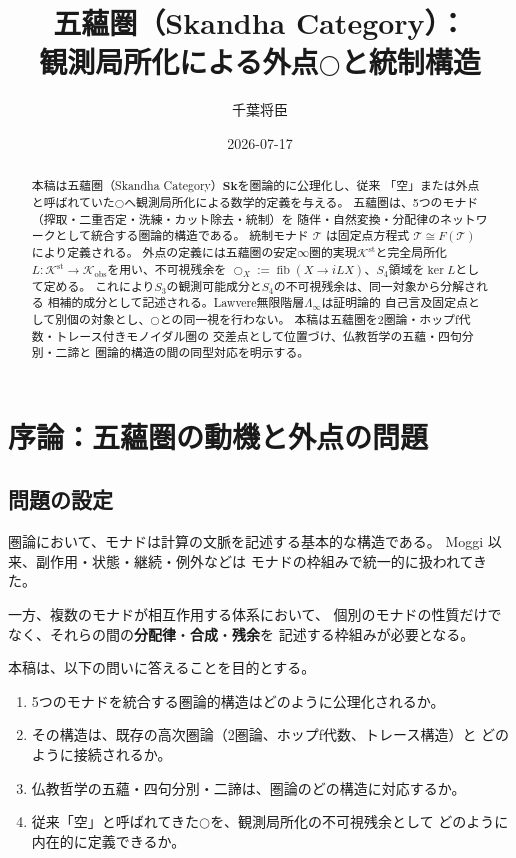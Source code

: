 \documentclass[11pt,a4paper]{ltjsarticle}
\theoremstyle{definition}
\newcommand{\Sk}{\mathbf{Sk}}
\newcommand{\T}{\mathcal{T}}
\newcommand{\LawvereInfinity}{\Lambda_\infty}
\newcommand{\Kstab}{\mathcal{K}^{\mathrm{st}}}
\newcommand{\Kobs}{\mathcal{K}_{\mathrm{obs}}}
\begin{document}
\title{五蘊圏（Skandha Category）：\\
観測局所化による外点$\bigcirc$と統制構造}
\author{千葉将臣}
\date{2026-07-17}
\maketitle

\begin{abstract}
本稿は五蘊圏（Skandha Category）$\Sk$を圏論的に公理化し、従来
「空」または外点と呼ばれていた$\bigcirc$へ観測局所化による数学的定義を与える。
五蘊圏は、5つのモナド（搾取・二重否定・洗練・カット除去・統制）を
随伴・自然変換・分配律のネットワークとして統合する圏論的構造である。
統制モナド $\T$ は固定点方程式 $\T \cong F(\T)$ により定義される。
外点の定義には五蘊圏の安定$\infty$圏的実現$\Kstab$と完全局所化
$L:\Kstab\to\Kobs$を用い、不可視残余を
$\bigcirc_X:=\operatorname{fib}(X\to iLX)$、$S_4$領域を$\ker L$として定める。
これにより$S_3$の観測可能成分と$S_4$の不可視残余は、同一対象から分解される
相補的成分として記述される。Lawvere無限階層$\LawvereInfinity$は証明論的
自己言及固定点として別個の対象とし、$\bigcirc$との同一視を行わない。
本稿は五蘊圏を2圏論・ホップf代数・トレース付きモノイダル圏の
交差点として位置づけ、仏教哲学の五蘊・四句分別・二諦と
圏論的構造の間の同型対応を明示する。
\end{abstract}

\tableofcontents
\newpage

\section{序論：五蘊圏の動機と外点の問題}

\subsection{問題の設定}

圏論において、モナドは計算の文脈を記述する基本的な構造である。
Moggi \cite{Moggi1991} 以来、副作用・状態・継続・例外などは
モナドの枠組みで統一的に扱われてきた。

一方、複数のモナドが相互作用する体系において、
個別のモナドの性質だけでなく、それらの間の\textbf{分配律}・\textbf{合成}・\textbf{残余}を
記述する枠組みが必要となる。

本稿は、以下の問いに答えることを目的とする。

\begin{enumerate}
\item 5つのモナドを統合する圏論的構造はどのように公理化されるか。
\item その構造は、既存の高次圏論（2圏論、ホップf代数、トレース構造）と
  どのように接続されるか。
\item 仏教哲学の五蘊・四句分別・二諦は、圏論のどの構造に対応するか。
\item 従来「空」と呼ばれてきた$\bigcirc$を、観測局所化の不可視残余として
  どのように内在的に定義できるか。
\end{enumerate}
\end{document}
